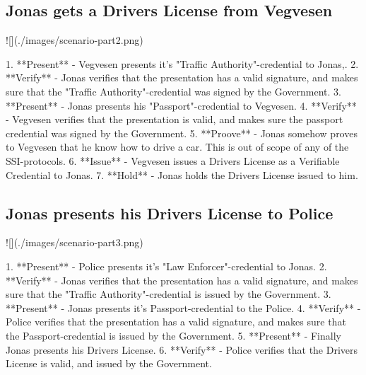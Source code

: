 \subsection{Jonas gets a Drivers License from Vegvesen}

![](./images/scenario-part2.png)

1. **Present** - Vegvesen presents it's "Traffic Authority"-credential to Jonas,.
2.  **Verify** - Jonas verifies that the presentation has a valid signature, and makes sure that the "Traffic Authority"-credential was signed by the Government.
3. **Present** - Jonas presents his "Passport"-credential to Vegvesen.
4. **Verify** - Vegvesen verifies that the presentation is valid, and makes sure the passport credential was signed by the Government.
5. **Proove** - Jonas somehow proves to Vegvesen that he know how to drive a car. This is out of scope of any of the SSI-protocols.
6. **Issue** - Vegvesen issues a Drivers License as a Verifiable Credential to Jonas.
7.  **Hold** - Jonas holds the Drivers License issued to him.

\subsection{Jonas presents his Drivers License to Police}

![](./images/scenario-part3.png)

1. **Present** - Police presents it's "Law Enforcer"-credential to Jonas.
2. **Verify** - Jonas verifies that the presentation has a valid signature, and makes sure that the "Traffic Authority"-credential is issued by the Government.
3. **Present** - Jonas presents it's Passport-credential to the Police.
4. **Verify** - Police verifies that the presentation has a valid signature, and makes sure that the Passport-credential is issued by the Government.
5. **Present** - Finally Jonas presents his Drivers License.
6. **Verify** - Police verifies that the Drivers License is valid, and issued by the Government.
